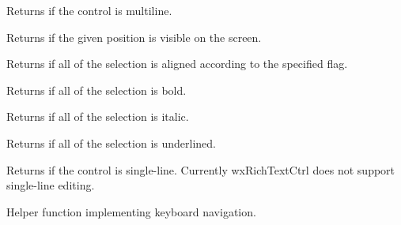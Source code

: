 
Returns \true if the control is multiline.

\label{wxrichtextctrlispositionvisible}


Returns \true if the given position is visible on the screen.

\label{wxrichtextctrlisselectionaligned}


Returns \true if all of the selection is aligned according to the specified flag.

\label{wxrichtextctrlisselectionbold}


Returns \true if all of the selection is bold.

\label{wxrichtextctrlisselectionitalics}


Returns \true if all of the selection is italic.

\label{wxrichtextctrlisselectionunderlined}


Returns \true if all of the selection is underlined.

\label{wxrichtextctrlissingleline}


Returns \true if the control is single-line. Currently wxRichTextCtrl does not
support single-line editing.

\label{wxrichtextctrlkeyboardnavigate}


Helper function implementing keyboard navigation.

\label{wxrichtextctrllayoutcontent}


